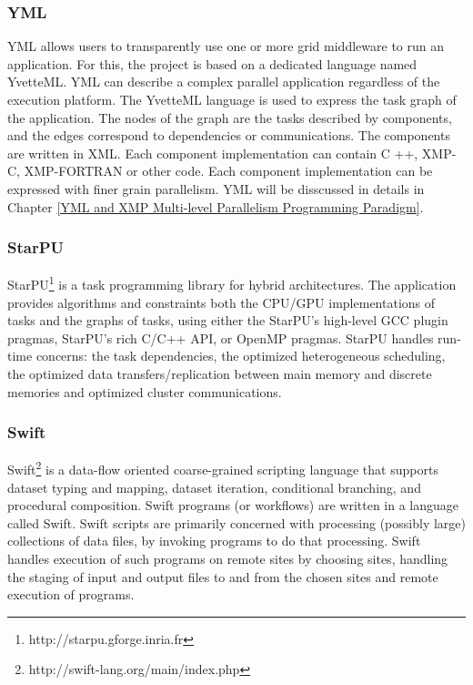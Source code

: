 \subsubsection{YML}

YML \cite{delannoyyml} allows users to transparently use one or more grid middleware to run an application. For this, the project is based on a dedicated language named YvetteML. YML can describe a complex parallel application regardless of the execution platform. The YvetteML language is used to express the task graph of the application. The nodes of the graph are the tasks described by components, and the edges correspond to dependencies or communications. The components are written in XML. Each component implementation can contain C ++, XMP-C, XMP-FORTRAN or other code. Each component implementation can be expressed with finer grain parallelism. YML will be disscussed in details in Chapter \ref{YML and XMP Multi-level Parallelism Programming Paradigm}.

\subsubsection{StarPU}

StarPU\footnote{http://starpu.gforge.inria.fr} \cite{augonnet2011starpu} is a task programming library for hybrid architectures. The application provides algorithms and constraints both the CPU/GPU implementations of tasks and the graphs of tasks, using either the StarPU's high-level GCC plugin pragmas, StarPU's rich C/C++ API, or OpenMP pragmas. StarPU handles run-time concerns: the task dependencies, the optimized heterogeneous scheduling, the optimized data transfers/replication between main memory and discrete memories and optimized cluster communications.

\subsubsection{Swift}

Swift\footnote{http://swift-lang.org/main/index.php} \cite{wilde2011swift} is a data-flow oriented coarse-grained scripting language that supports dataset typing and mapping, dataset iteration, conditional branching, and procedural composition. Swift programs (or workflows) are written in a language called Swift. Swift scripts are primarily concerned with processing (possibly large) collections of data files, by invoking programs to do that processing. Swift handles execution of such programs on remote sites by choosing sites, handling the staging of input and output files to and from the chosen sites and remote execution of programs.

